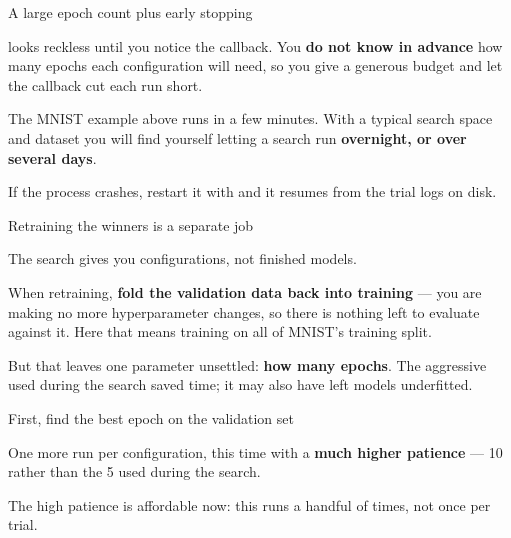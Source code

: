 \documentclass[aspectratio=169,11pt,t]{beamer}
\begin{document}
\begin{frame}[shrink=25]{A large epoch count plus early stopping}
{\fontsize{9.4}{12.6}\selectfont\color{fg2} looks reckless until you notice the  callback. You \textbf{do not know in advance} how many epochs each configuration will need, so you give a generous budget and let the callback cut each run short.\par}\vskip 4pt
{\fontsize{9.4}{12.6}\selectfont\color{fg2}The MNIST example above runs in a few minutes. With a typical search space and dataset you will find yourself letting a search run \textbf{overnight, or over several days}.\par}\vskip 4pt
\begin{iband}[amber]
If the process crashes, restart it with  and it resumes from the trial logs on disk. 
\end{iband}
\end{frame}

\begin{frame}[shrink=25]{Retraining the winners is a separate job}
{\fontsize{9.4}{12.6}\selectfont\color{fg2}The search gives you configurations, not finished models.\par}\vskip 4pt
{\fontsize{9.4}{12.6}\selectfont\color{fg2}When retraining, \textbf{fold the validation data back into training} --- you are making no more hyperparameter changes, so there is nothing left to evaluate against it. Here that means training on all of MNIST's training split.\par}\vskip 4pt
{\fontsize{9.4}{12.6}\selectfont\color{fg2}But that leaves one parameter unsettled: \textbf{how many epochs}. The aggressive  used during the search saved time; it may also have left models underfitted.\par}\vskip 4pt
\end{frame}

\begin{frame}[shrink=25]{First, find the best epoch on the validation set}
{\fontsize{9.4}{12.6}\selectfont\color{fg2}One more run per configuration, this time with a \textbf{much higher patience} --- 10 rather than the 5 used during the search.\par}\vskip 4pt
{\fontsize{9.4}{12.6}\selectfont\color{fg2}The high patience is affordable now: this runs a handful of times, not once per trial.\par}\vskip 4pt
\end{frame}
\end{document}
